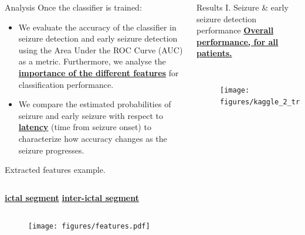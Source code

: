 \documentclass[final,t,overlay, xcolor=table, sans, mathserif]{beamer}
\begin{document}
\begin{frame}{}
\begin{columns}[t]
\begin{column}{.27\linewidth}
\begin{block}{Analysis}
Once the classifier is trained:
\begin{itemize}
\item[I.] We evaluate the accuracy of the classifier in seizure detection and early seizure detection using the
Area Under the ROC Curve (AUC) as a metric. Furthermore, we analyse the \underline{\bf importance of the different features}
for classification performance.
\item[II.] We compare the estimated probabilities of seizure and early seizure with respect to \underline{\bf latency}
 (time from seizure onset) to characterize
how accuracy changes as the seizure progresses.
\end{itemize}
\end{block}

\vspace{-0.2cm}
\begin{block}{Extracted features example.}
\begin{columns}
\centering
{\bf \qquad \underline{ictal segment}}
\centering
{\bf \quad \underline{inter-ictal segment}}
\end{columns}
\begin{figure}
\texttt{[image: figures/features.pdf]}
\end{figure}
\end{block}

\end{column}
\begin{column}{.4\linewidth}

\begin{block}{Results I. Seizure \& early seizure detection performance}
\centering
\underline{\bf Overall performance, for all patients.}
\begin{columns}
\vspace{-1cm}
\begin{figure}
\texttt{[image: figures/kaggle\_2\_train\_test\_ROCseizure.pdf]}
\end{figure}
\vspace{-1cm}
\begin{figure}
\texttt{[image: figures/kaggle\_2\_train\_test\_ROCearly.pdf]}
\end{figure}
\end{columns}


\end{block}
\end{column}
\end{columns}
\end{frame}
\end{document}
